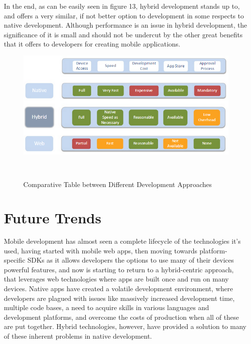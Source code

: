 \documentclass[11pt, twocolumn]{article}
\begin{document}
In the end, as can be easily seen in figure 13, hybrid development stands up to, and offers a very similar, if not better option to development in some respects to native development.  Although performance is an issue in hybrid development, the significance of it is small and should not be undercut by the other great benefits that it offers to developers for creating mobile applications.

\begin{figure}[h]
\includegraphics[scale=0.5]{ComparativeTable}
\caption{Comparative Table between Different Development Approaches} ~\cite{Kaminitz2012}
\end{figure}

\section{Future Trends}
Mobile development has almost seen a complete lifecycle of the technologies it's used, having started with mobile web apps, then moving towards platform-specific SDKs as it allows developers the options to use many of their devices powerful features, and now is starting to return to a hybrid-centric approach, that leverages web technologies where apps are built once and run on many devices.  Native apps have created a volatile development environment, where developers are plagued with issues like massively increased development time, multiple code bases, a need to acquire skills in various languages and development platforms, and overcome the costs of production when all of these are put together.  Hybrid technologies, however, have provided a solution to many of these inherent problems in native development.\\
\end{document}
